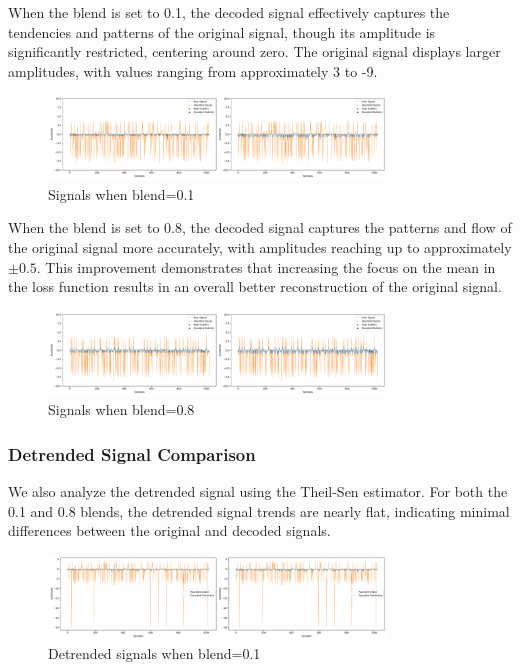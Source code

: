 When the blend is set to 0.1, the decoded signal effectively captures the tendencies and patterns of the original signal, though its amplitude is significantly restricted, centering around zero. The original signal displays larger amplitudes, with values ranging from approximately 3 to -9.
%
\begin{figure}[ht]
    \centering
    \includegraphics[width=0.8\textwidth]{static/original_vs_decoded_blend_01_resized.png}
    \caption{Signals when blend=0.1}
    \label{fig:signal_01}
\end{figure}
%
When the blend is set to 0.8, the decoded signal captures the patterns and flow of the original signal more accurately, with amplitudes reaching up to approximately $\pm0.5$. This improvement demonstrates that increasing the focus on the mean in the loss function results in an overall better reconstruction of the original signal.
%
\begin{figure}[ht]
    \centering
    \includegraphics[width=0.8\textwidth]{static/original_vs_decoded_blend_08_resized.png}
    \caption{Signals when blend=0.8}
    \label{fig:signal_08}
\end{figure}
%

\subsubsection{Detrended Signal Comparison} We also analyze the detrended signal using the Theil-Sen estimator. For both the 0.1 and 0.8 blends, the detrended signal trends are nearly flat, indicating minimal differences between the original and decoded signals.
%
\begin{figure}[ht]
    \centering
    \includegraphics[width=0.8\textwidth]{static/detrended_signal_blend_01_resized.png}
    \caption{Detrended signals when blend=0.1}
    \label{fig:detrended_signal_01}
\end{figure}
%

